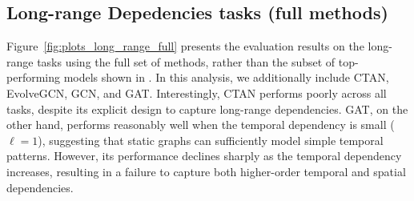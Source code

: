 \subsection{Long-range Depedencies tasks (full methods)} \label{apendix:spatio_temporal_full_methods}
Figure~\ref{fig:plots_long_range_full} presents the evaluation results on the long-range tasks using the full set of methods, rather than the subset of top-performing models shown in . In this analysis, we additionally include CTAN, EvolveGCN, GCN, and GAT. Interestingly, CTAN performs poorly across all tasks, despite its explicit design to capture long-range dependencies. GAT, on the other hand, performs reasonably well when the temporal dependency is small ($\ell=1$), suggesting that static graphs can sufficiently model simple temporal patterns. However, its performance declines sharply as the temporal dependency increases, resulting in a failure to capture both higher-order temporal and spatial dependencies.
